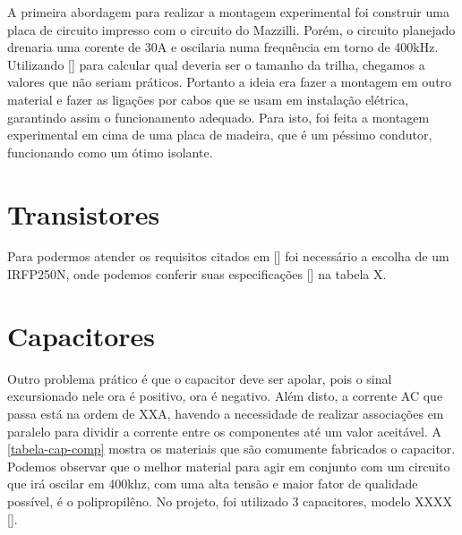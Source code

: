 A primeira abordagem para realizar a montagem experimental foi construir uma placa de circuito impresso com o circuito do Mazzilli. Porém, o circuito planejado drenaria uma corente de 30A e oscilaria numa frequência em torno de 400kHz. Utilizando [] para calcular qual deveria ser o tamanho da trilha, chegamos a valores que não seriam práticos. Portanto a ideia era fazer a montagem em outro material e fazer as ligações por cabos que se usam em instalação elétrica, garantindo assim o funcionamento adequado. Para isto, foi feita a montagem experimental em cima de uma placa de madeira, que é um péssimo condutor, funcionando como um ótimo isolante. 
\section{Transistores}
Para podermos atender os requisitos citados em [] foi necessário a escolha de um IRFP250N, onde podemos conferir suas especificações [] na tabela X.
\section{Capacitores}
Outro problema prático é que o capacitor deve ser apolar, pois o sinal excursionado nele ora é positivo, ora é negativo. Além disto, a corrente AC que passa está na ordem de XXA, havendo a necessidade de realizar associações em paralelo para dividir a corrente entre os componentes até um valor aceitável. A \ref{tabela-cap-comp} mostra os materiais que são comumente fabricados o capacitor. Podemos observar que o melhor material para agir em conjunto com um circuito que irá oscilar em 400khz, com uma alta tensão e maior fator de qualidade possível, é o polipropilêno. No projeto, foi utilizado 3 capacitores, modelo XXXX [].


\begin{table}[htb]
\end{table}



